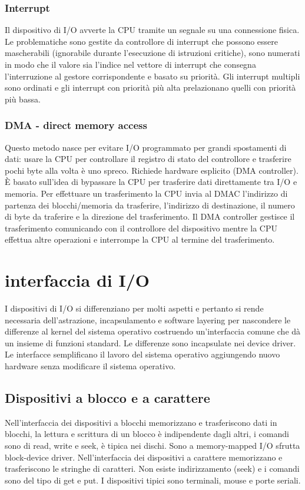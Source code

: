 \subsubsection{Interrupt}
Il dispositivo di I/O avverte la CPU tramite un segnale su una connessione fisica. Le problematiche sono gestite da controllore di interrupt che possono essere mascherabili (ignorabile
durante l'esecuzione di istruzioni critiche), sono numerati in modo che il valore sia l'indice nel vettore di interrupt che consegna l'interruzione al gestore corrispondente e basato su
priorit\`a. Gli interrupt multipli sono ordinati e gli interrupt con priorit\`a pi\`u alta prelazionano quelli con priorit\`a pi\`u bassa. 
\subsubsection{DMA - direct memory access}
Questo metodo nasce per evitare I/O programmato per grandi spostamenti di dati: usare la CPU per controllare il registro di stato del controllore e trasferire pochi byte alla volta \`e 
uno spreco. Richiede hardware esplicito (DMA controller). \`E basato sull'idea di bypassare la CPU per trasferire dati direttamente tra I/O e memoria. Per effettuare un trasferimento
la CPU invia al DMAC l'indirizzo di partenza dei blocchi/memoria da trasferire, l'indirizzo di destinazione, il numero di byte da traferire e la direzione del trasferimento. Il DMA
controller gestisce il trasferimento comunicando con il controllore del dispositivo mentre la CPU effettua altre operazioni e interrompe la CPU al termine del trasferimento. 
\section{interfaccia di I/O}
I dispositivi di I/O si differenziano per molti aspetti e pertanto si rende necessaria dell'astrazione, incapsulamento e software layering per nascondere le differenze al kernel del 
sistema operativo costruendo un'interfaccia comune che d\`a un insieme di funzioni standard. Le differenze sono incapsulate nei device driver. Le interfacce semplificano il lavoro del
sistema operativo aggiungendo nuovo hardware senza modificare il sistema operativo. 
\subsection{Dispositivi a blocco e a carattere}
Nell'interfaccia dei dispositivi a blocchi memorizzano e trasferiscono dati in blocchi, la lettura e scrittura di un blocco \`e indipendente dagli altri, i comandi sono di 
read, write e seek, \`e tipica nei dischi. Sono a memory-mapped I/O sfrutta block-device driver. Nell'interfaccia dei dispositivi a carattere memorizzano e trasferiscono le stringhe di
caratteri. Non esiste indirizzamento (seek) e i comandi sono del tipo di get e put. I dispositivi tipici sono terminali, mouse e porte seriali. 
